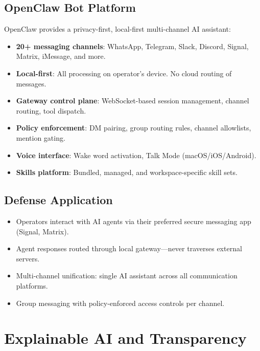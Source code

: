 \documentclass[11pt,letterpaper]{article}
\begin{document}
\subsection{OpenClaw Bot Platform}

OpenClaw provides a privacy-first, local-first multi-channel AI assistant:

\begin{itemize}
\item \textbf{20+ messaging channels}: WhatsApp, Telegram, Slack, Discord, Signal, Matrix, iMessage, and more.
\item \textbf{Local-first}: All processing on operator's device. No cloud routing of messages.
\item \textbf{Gateway control plane}: WebSocket-based session management, channel routing, tool dispatch.
\item \textbf{Policy enforcement}: DM pairing, group routing rules, channel allowlists, mention gating.
\item \textbf{Voice interface}: Wake word activation, Talk Mode (macOS/iOS/Android).
\item \textbf{Skills platform}: Bundled, managed, and workspace-specific skill sets.
\end{itemize}

\subsection{Defense Application}

\begin{itemize}
\item Operators interact with AI agents via their preferred secure messaging app (Signal, Matrix).
\item Agent responses routed through local gateway---never traverses external servers.
\item Multi-channel unification: single AI assistant across all communication platforms.
\item Group messaging with policy-enforced access controls per channel.
\end{itemize}

\section{Explainable AI and Transparency}
\end{document}
